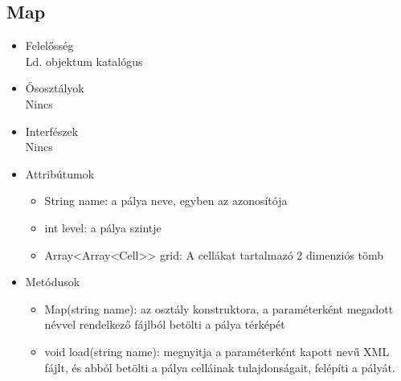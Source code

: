 \subsection{Map}
\begin{itemize}
\item Felelősség\\
Ld. objektum katalógus
\item Ősosztályok\\
Nincs
\item Interfészek\\
Nincs
\item Attribútumok\\
	\begin{itemize}
		\item String name: a pálya neve, egyben az azonosítója
		\item int level: a pálya szintje
		\item Array<Array<Cell>> grid: A cellákat tartalmazó 2 dimenziós tömb

		
	\end{itemize}
\item Metódusok\\
	\begin{itemize}
		
		\item Map(string name): az osztály konstruktora, a paraméterként megadott névvel rendelkező fájlból betölti a pálya térképét
		\item void load(string name): megnyitja a paraméterként kapott nevű XML fájlt, és abból betölti a pálya celláinak tulajdonságait, felépíti a pályát.
		
		
	\end{itemize}
\end{itemize}
